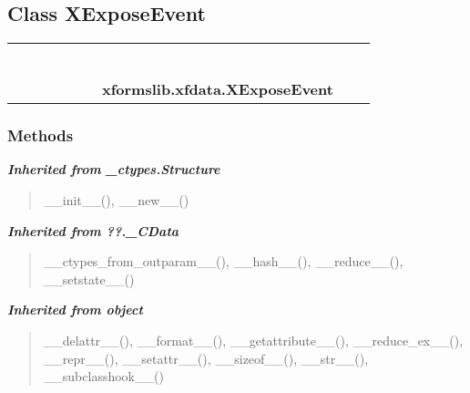 \subsection{Class XExposeEvent}

    \label{xformslib:xfdata:XExposeEvent}
\begin{tabular}{cccccccccc}
\multicolumn{2}{r}{\settowidth{\BCL}{object}\multirow{2}{\BCL}{object}}
&&
&&
&&
  \\\cline{3-3}
  &&\multicolumn{1}{c|}{}
&&
&&
&&
  \\
\multicolumn{4}{r}{\settowidth{\BCL}{??.\_CData}\multirow{2}{\BCL}{??.\_CData}}
&&
&&
  \\\cline{5-5}
  &&&&\multicolumn{1}{c|}{}
&&
&&
  \\
\multicolumn{6}{r}{\settowidth{\BCL}{\_ctypes.Structure}\multirow{2}{\BCL}{\_ctypes.Structure}}
&&
  \\\cline{7-7}
  &&&&&&\multicolumn{1}{c|}{}
&&
  \\
&&&&&&\multicolumn{2}{l}{\textbf{xformslib.xfdata.XExposeEvent}}
\end{tabular}



  \subsubsection{Methods}


\large{\textbf{\textit{Inherited from \_ctypes.Structure}}}

\begin{quote}
\_\_init\_\_(), \_\_new\_\_()
\end{quote}

\large{\textbf{\textit{Inherited from ??.\_CData}}}

\begin{quote}
\_\_ctypes\_from\_outparam\_\_(), \_\_hash\_\_(), \_\_reduce\_\_(), \_\_setstate\_\_()
\end{quote}

\large{\textbf{\textit{Inherited from object}}}

\begin{quote}
\_\_delattr\_\_(), \_\_format\_\_(), \_\_getattribute\_\_(), \_\_reduce\_ex\_\_(), \_\_repr\_\_(), \_\_setattr\_\_(), \_\_sizeof\_\_(), \_\_str\_\_(), \_\_subclasshook\_\_()
\end{quote}

